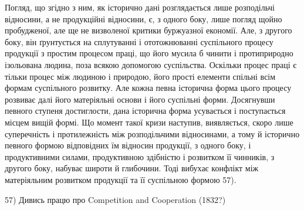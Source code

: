 Погляд, що згідно з ним, як історично дані розглядається лише розподільчі
відносини, а не продукційні відносини, є, з одного боку, лише погляд щойно пробудженої,
але ще не визволеної критики буржуазної економії. Але, з другого боку,
він ґрунтується на сплутуванні і ототожнюванні суспільного процесу продукції з
простим процесом праці, що його мусила б чинити і протиприродно ізольована
людина, поза всякою допомогою суспільства. Оскільки процес праці є тільки процес
між людиною і природою, його прості елементи спільні всім формам суспільного
розвитку. Але кожна певна історична форма цього процесу розвиває далі його матеріяльні
основи і його суспільні форми. Досягнувши певного ступеня достиглости,
дана історична форма усувається і поступається місцем вищій формі. Що момент
такої кризи наступив, виявляється, скоро лише суперечність і протилежність між
розподільчими відносинами, а тому й історично певного формою відповідних їм відносин
продукції, з одного боку, і продуктивними силами, продуктивною здібністю
і розвитком її чинників, з другого боку, набуває широти й глибочини. Тоді вибухає
конфлікт між матеріяльним розвитком продукції та її суспільною формою 57).

57) Дивись працю про Competition and Cooperation (1832?)
